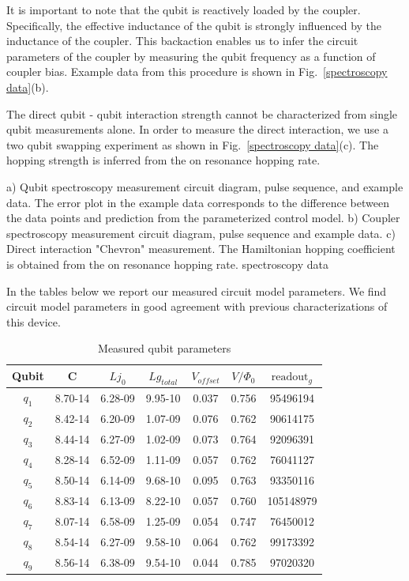 It is important to note that the qubit is reactively loaded by the coupler.
Specifically, the effective inductance of the qubit is strongly influenced by the inductance of the coupler.
This backaction enables us to infer the circuit parameters of the coupler by measuring the qubit frequency as a function of coupler bias.
Example data from this procedure is shown in Fig.~\ref{spectroscopy data}(b).

The direct qubit - qubit interaction strength cannot be characterized from single qubit measurements alone.
In order to measure the direct interaction, we use a two qubit swapping experiment as shown in Fig.~\ref{spectroscopy data}(c).
The hopping strength is inferred from the on resonance hopping rate.

{
a) Qubit spectroscopy measurement circuit diagram, pulse sequence, and example data.
The error plot in the example data corresponds to the difference between the data points and prediction from the parameterized control model.
b) Coupler spectroscopy measurement circuit diagram, pulse sequence and example data.
c) Direct interaction "Chevron" measurement.  The Hamiltonian hopping coefficient is obtained from the on resonance hopping rate.
}
{spectroscopy data}

In the tables below we report our measured circuit model parameters.
We find circuit model parameters in good agreement with previous characterizations of this device.\cite{Neill2018}
\begin{table}
    \caption{Measured qubit parameters}
    \centering
    \begin{tabular}{ c c c c c c c}
        \hline \hline
        Qubit & C & $Lj_{0}$ & $Lg_{total}$ & $V_{offset}$ & $V/ \Phi_{0}$ & $\text{readout}_{g}$ \\
        \hline
        $q_1$ & 8.70-14 & 6.28-09 & 9.95-10 & 0.037 & 0.756 & 95496194  \\
        $q_2$ & 8.42-14 & 6.20-09 & 1.07-09 & 0.076 & 0.762 & 90614175  \\
        $q_3$ & 8.44-14 & 6.27-09 & 1.02-09 & 0.073 & 0.764 & 92096391  \\
        $q_4$ & 8.28-14 & 6.52-09 & 1.11-09 & 0.057 & 0.762 & 76041127  \\
        $q_5$ & 8.50-14 & 6.14-09 & 9.68-10 & 0.095 & 0.763 & 93350116  \\
        $q_6$ & 8.83-14 & 6.13-09 & 8.22-10 & 0.057 & 0.760 & 105148979 \\
        $q_7$ & 8.07-14 & 6.58-09 & 1.25-09 & 0.054 & 0.747 & 76450012  \\
        $q_8$ & 8.54-14 & 6.27-09 & 9.58-10 & 0.064 & 0.762 & 99173392  \\
        $q_9$ & 8.56-14 & 6.38-09 & 9.54-10 & 0.044 & 0.785 & 97020320  \\
        \hline
    \end{tabular}
    \label{table:Qubit Parameters}
\end{table}


